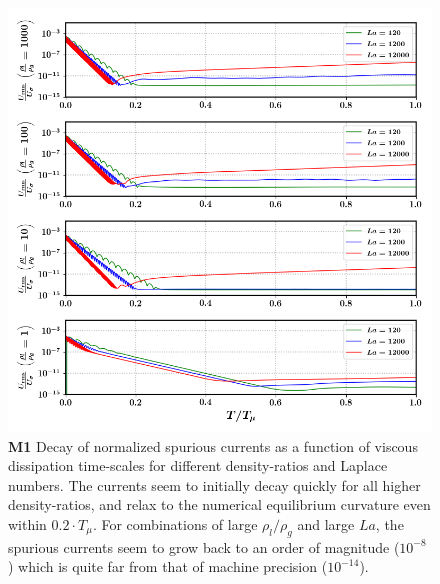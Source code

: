 \begin{figure}[h!]
    \centering
    \includegraphics[]{plots/static_drop/decay_nonmc.png}
	\caption{\textbf{M1} Decay of normalized spurious currents as a function of viscous dissipation time-scales for different density-ratios and Laplace numbers. The currents seem to initially decay quickly for all higher density-ratios, and relax to the numerical equilibrium curvature even within $0.2 \cdot T_\mu$. For combinations of large $\rho_l / \rho_g$ and large $La$, the spurious currents seem to grow back to an order of magnitude ($10^{-8}$) which is quite far from that of machine precision ($10^{-14}$).}   
    \label{decay_nonmc}
\end{figure}

